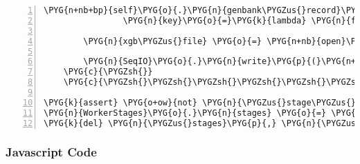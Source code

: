 \begin{Verbatim}[commandchars=\\\{\},numbers=left,firstnumber=1,stepnumber=5]
        \PYG{n+nb+bp}{self}\PYG{o}{.}\PYG{n}{genbank\PYGZus{}record}\PYG{o}{.}\PYG{n}{features}\PYG{o}{.}\PYG{n}{sort}\PYG{p}{(}
                \PYG{n}{key}\PYG{o}{=}\PYG{k}{lambda} \PYG{n}{f}\PYG{p}{:} \PYG{n}{f}\PYG{o}{.}\PYG{n}{location}\PYG{o}{.}\PYG{n}{start}\PYG{o}{.}\PYG{n}{position}\PYG{p}{)}

        \PYG{n}{xgb\PYGZus{}file} \PYG{o}{=} \PYG{n+nb}{open}\PYG{p}{(}\PYG{n+nb+bp}{self}\PYG{o}{.}\PYG{n}{analysis}\PYG{o}{.}\PYG{n}{xgenbankfile\PYGZus{}path}\PYG{p}{,} \PYG{l+s}{"}\PYG{l+s}{w}\PYG{l+s}{"}\PYG{p}{)}

        \PYG{n}{SeqIO}\PYG{o}{.}\PYG{n}{write}\PYG{p}{(}\PYG{n+nb+bp}{self}\PYG{o}{.}\PYG{n}{genbank\PYGZus{}record}\PYG{p}{,} \PYG{n}{xgb\PYGZus{}file}\PYG{p}{,} \PYG{l+s}{"}\PYG{l+s}{genbank}\PYG{l+s}{"}\PYG{p}{)}
    \PYG{c}{\PYGZsh{}}
    \PYG{c}{\PYGZsh{}\PYGZsh{}\PYGZsh{}\PYGZsh{}\PYGZsh{}\PYGZsh{}\PYGZsh{}\PYGZsh{}\PYGZsh{}\PYGZsh{}\PYGZsh{}\PYGZsh{}\PYGZsh{}\PYGZsh{}\PYGZsh{}\PYGZsh{}\PYGZsh{}\PYGZsh{}\PYGZsh{}\PYGZsh{}\PYGZsh{}\PYGZsh{}\PYGZsh{}\PYGZsh{}\PYGZsh{}\PYGZsh{}\PYGZsh{}\PYGZsh{}\PYGZsh{}\PYGZsh{}\PYGZsh{}\PYGZsh{}\PYGZsh{}\PYGZsh{}\PYGZsh{}\PYGZsh{}\PYGZsh{}\PYGZsh{}\PYGZsh{}\PYGZsh{}\PYGZsh{}\PYGZsh{}\PYGZsh{}\PYGZsh{}\PYGZsh{}\PYGZsh{}\PYGZsh{}\PYGZsh{}\PYGZsh{}\PYGZsh{}\PYGZsh{}\PYGZsh{}\PYGZsh{}\PYGZsh{}\PYGZsh{}\PYGZsh{}\PYGZsh{}\PYGZsh{}\PYGZsh{}\PYGZsh{}\PYGZsh{}\PYGZsh{}\PYGZsh{}\PYGZsh{}\PYGZsh{}\PYGZsh{}\PYGZsh{}\PYGZsh{}\PYGZsh{}\PYGZsh{}\PYGZsh{}\PYGZsh{}\PYGZsh{}\PYGZsh{}\PYGZsh{}\PYGZsh{}}

\PYG{k}{assert} \PYG{o+ow}{not} \PYG{n}{\PYGZus{}stage\PYGZus{}conds}\PYG{p}{,} \PYG{l+s}{"}\PYG{l+s}{@stage\PYGZus{}cond}\PYG{l+s}{'}\PYG{l+s}{s must be declared before @stage}\PYG{l+s}{'}\PYG{l+s}{s}\PYG{l+s}{"}
\PYG{n}{WorkerStages}\PYG{o}{.}\PYG{n}{stages} \PYG{o}{=} \PYG{n}{\PYGZus{}stages}
\PYG{k}{del} \PYG{n}{\PYGZus{}stages}\PYG{p}{,} \PYG{n}{\PYGZus{}stage\PYGZus{}conds}
\end{Verbatim}


\subsubsection{Javascript Code}
\label{rnaseqlyze-pdf:javascript-code}

